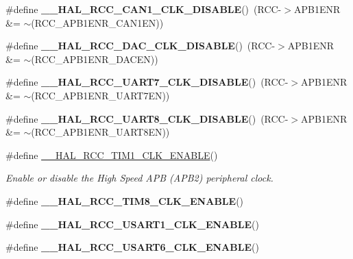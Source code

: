 \begin{DoxyCompactItemize}
\#define {\bfseries \+\_\+\+\_\+\+H\+A\+L\+\_\+\+R\+C\+C\+\_\+\+C\+A\+N1\+\_\+\+C\+L\+K\+\_\+\+D\+I\+S\+A\+B\+LE}()~(R\+CC-\/$>$A\+P\+B1\+E\+NR \&= $\sim$(R\+C\+C\+\_\+\+A\+P\+B1\+E\+N\+R\+\_\+\+C\+A\+N1\+EN))
\item 
\mbox{\label{group___r_c_c_ex___peripheral___clock___enable___disable_ga6817d8397756e235e5d29e980c7dbb47}} 
\#define {\bfseries \+\_\+\+\_\+\+H\+A\+L\+\_\+\+R\+C\+C\+\_\+\+D\+A\+C\+\_\+\+C\+L\+K\+\_\+\+D\+I\+S\+A\+B\+LE}()~(R\+CC-\/$>$A\+P\+B1\+E\+NR \&= $\sim$(R\+C\+C\+\_\+\+A\+P\+B1\+E\+N\+R\+\_\+\+D\+A\+C\+EN))
\item 
\mbox{\label{group___r_c_c_ex___peripheral___clock___enable___disable_ga9938ea115b1c865b757f54673ca8c97b}} 
\#define {\bfseries \+\_\+\+\_\+\+H\+A\+L\+\_\+\+R\+C\+C\+\_\+\+U\+A\+R\+T7\+\_\+\+C\+L\+K\+\_\+\+D\+I\+S\+A\+B\+LE}()~(R\+CC-\/$>$A\+P\+B1\+E\+NR \&= $\sim$(R\+C\+C\+\_\+\+A\+P\+B1\+E\+N\+R\+\_\+\+U\+A\+R\+T7\+EN))
\item 
\mbox{\label{group___r_c_c_ex___peripheral___clock___enable___disable_ga741b1908bd8c5ba1822dd87d507510a7}} 
\#define {\bfseries \+\_\+\+\_\+\+H\+A\+L\+\_\+\+R\+C\+C\+\_\+\+U\+A\+R\+T8\+\_\+\+C\+L\+K\+\_\+\+D\+I\+S\+A\+B\+LE}()~(R\+CC-\/$>$A\+P\+B1\+E\+NR \&= $\sim$(R\+C\+C\+\_\+\+A\+P\+B1\+E\+N\+R\+\_\+\+U\+A\+R\+T8\+EN))
\item 
\#define \mbox{\hyperlink{group___r_c_c_ex___peripheral___clock___enable___disable_gad693d7300ed7134b60bb1a645e762358}{\+\_\+\+\_\+\+H\+A\+L\+\_\+\+R\+C\+C\+\_\+\+T\+I\+M1\+\_\+\+C\+L\+K\+\_\+\+E\+N\+A\+B\+LE}}()
\begin{DoxyCompactList}\small\item\em Enable or disable the High Speed A\+PB (A\+P\+B2) peripheral clock. \end{DoxyCompactList}\item 
\#define {\bfseries \+\_\+\+\_\+\+H\+A\+L\+\_\+\+R\+C\+C\+\_\+\+T\+I\+M8\+\_\+\+C\+L\+K\+\_\+\+E\+N\+A\+B\+LE}()
\item 
\#define {\bfseries \+\_\+\+\_\+\+H\+A\+L\+\_\+\+R\+C\+C\+\_\+\+U\+S\+A\+R\+T1\+\_\+\+C\+L\+K\+\_\+\+E\+N\+A\+B\+LE}()
\item 
\#define {\bfseries \+\_\+\+\_\+\+H\+A\+L\+\_\+\+R\+C\+C\+\_\+\+U\+S\+A\+R\+T6\+\_\+\+C\+L\+K\+\_\+\+E\+N\+A\+B\+LE}()

\end{DoxyCompactItemize}
